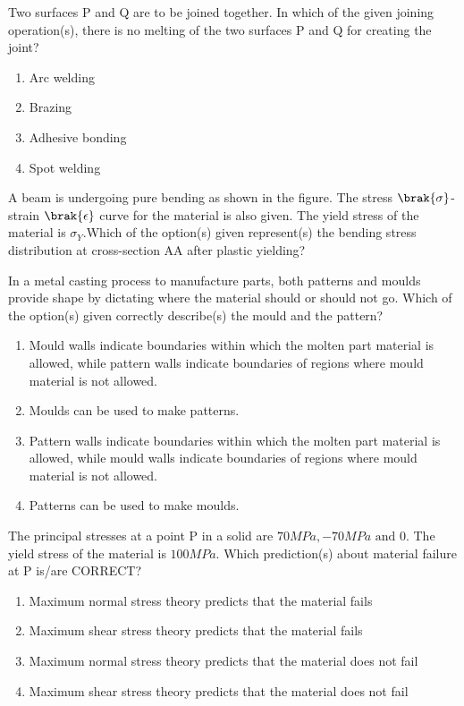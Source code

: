     \item 
    Two surfaces P and Q are to be joined together. In which of the given joining operation(s), there is no melting of the two surfaces P and Q for creating the joint?
    \begin{enumerate}
        \item Arc welding
        \item Brazing
        \item Adhesive bonding
        \item Spot welding
    \end{enumerate}

    \item
    A beam is undergoing pure bending as shown in the figure. The stress $\brak{\sigma}$-strain $\brak{\epsilon}$ curve for the material is also given. The yield stress of the material is $\sigma_Y$.Which of the option(s) given represent(s) the bending stress distribution at cross-section AA after plastic yielding?

    \item 
    In a metal casting process to manufacture parts, both patterns and moulds provide shape by dictating where the material should or should not go. Which of the option(s) given correctly describe(s) the mould and the pattern?

    \begin{enumerate}
        \item Mould walls indicate boundaries within which the molten part material is allowed, while pattern walls indicate boundaries of regions where mould material is not allowed.
        \item Moulds can be used to make patterns.
        \item Pattern walls indicate boundaries within which the molten part material is allowed, while mould walls indicate boundaries of regions where mould material is not allowed.
        \item Patterns can be used to make moulds.
    \end{enumerate}

    \item The principal stresses at a point P in a solid are $70 MPa, -70 MPa \text{ and } 0$. The yield stress of the material is $100 MPa$. Which prediction(s) about material failure at P is/are CORRECT?

    \begin{enumerate}
        \item Maximum normal stress theory predicts that the material fails
        \item Maximum shear stress theory predicts that the material fails
        \item Maximum normal stress theory predicts that the material does not fail
        \item Maximum shear stress theory predicts that the material does not fail
    \end{enumerate}

